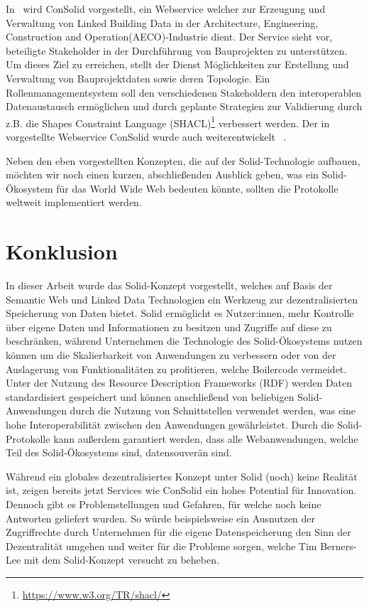 \documentclass[acmtog]{acmart}
\begin{document}
In~\cite{8633673} wird ConSolid vorgestellt, ein Webservice welcher zur Erzeugung und Verwaltung von Linked Building Data in der Architecture, Engineering, Construction and Operation(AECO)-Industrie dient. Der Service sieht vor, beteiligte Stakeholder in der Durchführung von Bauprojekten zu unterstützen. Um dieses Ziel zu erreichen, stellt der Dienst Möglichkeiten zur Erstellung und Verwaltung von Bauprojektdaten sowie deren Topologie. Ein Rollenmanagementsystem soll den verschiedenen Stakeholdern den interoperablen Datenaustausch ermöglichen und durch geplante Strategien zur Validierung durch z.B. die Shapes Constraint Language (SHACL)\footnote{\url{https://www.w3.org/TR/shacl/}} verbessert werden. Der in ~\cite{8633673} vorgestellte Webservice ConSolid wurde auch weiterentwickelt ~\cite{werbrouck2022consolid}.

Neben den eben vorgestellten Konzepten, die auf der Solid-Technologie aufbauen, möchten wir noch einen kurzen, abschließenden Ausblick geben, was ein Solid-Ökosystem für das World Wide Web bedeuten könnte, sollten die Protokolle weltweit implementiert werden. 

\label{section:konklusion}
\section{Konklusion}
In dieser Arbeit wurde das Solid-Konzept vorgestellt, welches auf Basis der Semantic Web und Linked Data Technologien ein Werkzeug zur dezentralisierten Speicherung von Daten bietet. Solid ermöglicht es Nutzer:innen, mehr Kontrolle über eigene Daten und Informationen zu besitzen und Zugriffe auf diese zu beschränken, während Unternehmen die Technologie des Solid-Ökosystems nutzen können um die Skalierbarkeit von Anwendungen zu verbessern oder von der Auslagerung von Funktionalitäten zu profitieren, welche Boilercode vermeidet. Unter der Nutzung des Resource Description Frameworks (RDF) werden Daten standardisiert gespeichert und können anschließend von beliebigen Solid-Anwendungen durch die Nutzung von Schnittstellen verwendet werden, was eine hohe Interoperabilität zwischen den Anwendungen gewährleistet. Durch die Solid-Protokolle kann außerdem garantiert werden, dass alle Webanwendungen, welche Teil des Solid-Ökosystems sind, datensouverän sind.

Während ein globales dezentralisiertes Konzept unter Solid (noch) keine Realität ist, zeigen bereits jetzt Services wie ConSolid ein hohes Potential für Innovation. Dennoch gibt es Problemstellungen und Gefahren, für welche noch keine Antworten geliefert wurden. So würde beispielsweise ein Ausnutzen der Zugriffrechte durch Unternehmen für die eigene Datenspeicherung den Sinn der Dezentralität umgehen und weiter für die Probleme sorgen, welche Tim Berners-Lee mit dem Solid-Konzept versucht zu beheben. 
\end{document}
